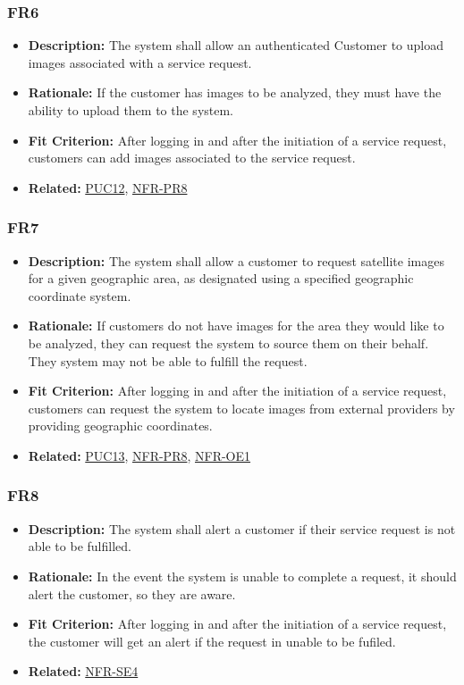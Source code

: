\documentclass[12pt]{article}
\begin{document}
\subsubsection*{FR6}
\label{sec:FR6}
\begin{itemize}
  \item \textbf{Description:} The system shall allow an authenticated Customer to upload images associated with a service request.
  \item \textbf{Rationale:} If the customer has images to be analyzed, they must have the ability to upload them to the system.
  \item \textbf{Fit Criterion:} After logging in and after the initiation of a service request, customers can add images associated to the service request.
  \item \textbf{Related:} \hyperref[sec:PUC12]{PUC12}, \hyperref[sec:PR8]{NFR-PR8}
\end{itemize}
\subsubsection*{FR7}
\label{sec:FR7}
\begin{itemize}
  \item \textbf{Description:} The system shall allow a customer to request satellite images for a given geographic area, as designated using a specified geographic coordinate system.
  \item \textbf{Rationale:} If customers do not have images for the area they would like to be analyzed, they can request the system to source them on their behalf. They system may not be able to fulfill the request.
  \item \textbf{Fit Criterion:} After logging in and after the initiation of a service request, customers can request the system to locate images from external providers by providing geographic coordinates.
  \item \textbf{Related:} \hyperref[sec:PUC13]{PUC13}, \hyperref[sec:PR8]{NFR-PR8}, \hyperref[sec:OE1]{NFR-OE1}
\end{itemize}
\subsubsection*{FR8}
\label{sec:FR8}
\begin{itemize}
  \item \textbf{Description:} The system shall alert a customer if their service request is not able to be fulfilled.
  \item \textbf{Rationale:} In the event the system is unable to complete a request, it should alert the customer, so they are aware.
  \item \textbf{Fit Criterion:} After logging in and after the initiation of a service request, the customer will get an alert if the request in unable to be fufiled.
  \item \textbf{Related:} \hyperref[sec:SE4]{NFR-SE4}
\end{itemize}
\end{document}
